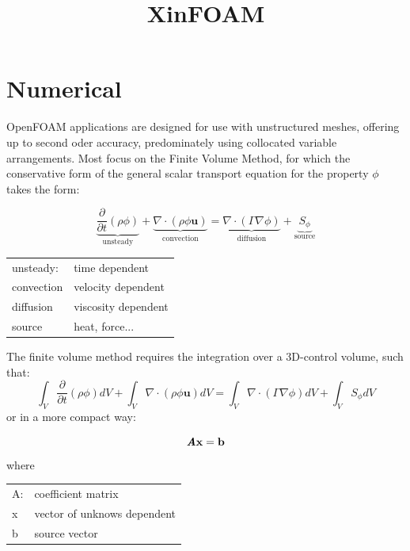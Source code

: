 \documentclass{article}
\title{XinFOAM}
\begin{document}
\maketitle

\section{Numerical}
OpenFOAM applications are designed for use with unstructured meshes, offering up to second oder accuracy, predominately using collocated variable arrangements. Most focus on the Finite Volume Method, for which the conservative form of the general scalar transport equation for the property $\phi$ takes the form:

\begin{equation}
\underbrace{\frac{\partial}{\partial t} (\rho\phi)}_{\mathrm{unsteady}} + \underbrace{\nabla \cdot (\rho \phi \textbf{u})}_{\mathrm{convection}} = \underbrace{\nabla \cdot (\Gamma \nabla \phi)}_{\mathrm{diffusion}} + \underbrace{S_{\phi}}_{\mathrm{source}}
\label{eq:transport equation}
\end{equation}


\begin{table}[hbp!]
\begin{tabular}{l l}
	unsteady: &   time dependent\\
	convection & velocity dependent\\
	diffusion & viscosity dependent \\
	source & heat, force...
\end{tabular}
\end{table}
The finite volume method requires the integration over a 3D-control volume, such that:
\begin{equation}
\int_V \frac{\partial}{\partial t} {(\rho \phi)} dV + \int_V \nabla \cdot \left(\rho \phi \textbf{u} \right) dV = \int_V \nabla \cdot \left(\Gamma \nabla \phi \right) dV + \int_V S_\phi dV 
\label{eq:intergal transport equation}
\end{equation}
or in a more compact way:

\begin{equation}
\textit{\textbf{A}}\textbf{x} = \textbf{b}
\end{equation}
where
\begin{table}[hbp!]
\begin{tabular}{l l}
	A: &   coefficient matrix\\
	x & vector of unknows dependent\\
	b & source vector
\end{tabular}
\end{table}
\end{document}
